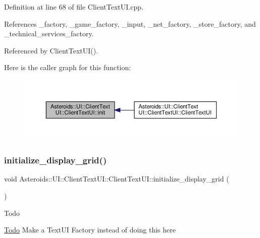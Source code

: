 Definition at line 68 of file Client\+Text\+U\+I.\+cpp.



References \+\_\+factory, \+\_\+game\+\_\+factory, \+\_\+input, \+\_\+net\+\_\+factory, \+\_\+store\+\_\+factory, and \+\_\+technical\+\_\+services\+\_\+factory.



Referenced by Client\+Text\+U\+I().

Here is the caller graph for this function\+:
\nopagebreak
\begin{figure}[H]
\begin{center}
\leavevmode
\includegraphics[width=350pt]{classAsteroids_1_1UI_1_1ClientTextUI_1_1ClientTextUI_af89b843cd3eecc9b5b54cf3067b5fab8_icgraph}
\end{center}
\end{figure}
\mbox{\label{classAsteroids_1_1UI_1_1ClientTextUI_1_1ClientTextUI_a681a6bfc7d4438a4eb3cc146c9117125}} 
\subsubsection{\texorpdfstring{initialize\+\_\+display\+\_\+grid()}{initialize\_display\_grid()}}
{\footnotesize\ttfamily void Asteroids\+::\+U\+I\+::\+Client\+Text\+U\+I\+::\+Client\+Text\+U\+I\+::initialize\+\_\+display\+\_\+grid (\begin{DoxyParamCaption}{ }\end{DoxyParamCaption})\hspace{0.3cm}{\ttfamily [private]}}

\begin{DoxyRefDesc}{Todo}
\item[\hyperlink{todo__todo000022}{Todo}]Make a Text\+UI Factory instead of doing this here \end{DoxyRefDesc}


